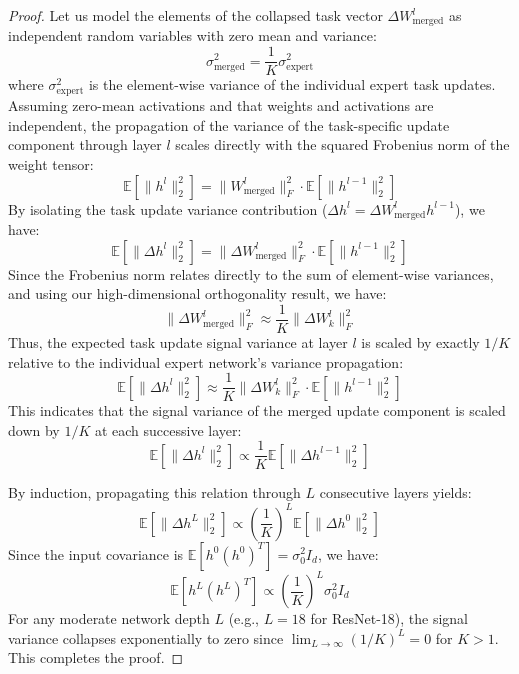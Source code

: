 \documentclass{article}
\theoremstyle{plain}
\theoremstyle{definition}
\theoremstyle{remark}
\begin{document}
\begin{proof}
Let us model the elements of the collapsed task vector $\Delta W_{\text{merged}}^l$ as independent random variables with zero mean and variance:
\begin{equation}
\sigma_{\text{merged}}^2 = \frac{1}{K} \sigma_{\text{expert}}^2
\end{equation}
where $\sigma_{\text{expert}}^2$ is the element-wise variance of the individual expert task updates. Assuming zero-mean activations and that weights and activations are independent, the propagation of the variance of the task-specific update component through layer $l$ scales directly with the squared Frobenius norm of the weight tensor:
\begin{equation}
\mathbb{E}[\|h^l\|_2^2] = \|W_{\text{merged}}^l\|_F^2 \cdot \mathbb{E}[\|h^{l-1}\|_2^2]
\end{equation}
By isolating the task update variance contribution ($\Delta h^l = \Delta W_{\text{merged}}^l h^{l-1}$), we have:
\begin{equation}
\mathbb{E}[\|\Delta h^l\|_2^2] = \|\Delta W_{\text{merged}}^l\|_F^2 \cdot \mathbb{E}[\|h^{l-1}\|_2^2]
\end{equation}
Since the Frobenius norm relates directly to the sum of element-wise variances, and using our high-dimensional orthogonality result, we have:
\begin{equation}
\|\Delta W_{\text{merged}}^l\|_F^2 \approx \frac{1}{K} \|\Delta W_k^l\|_F^2
\end{equation}
Thus, the expected task update signal variance at layer $l$ is scaled by exactly $1/K$ relative to the individual expert network's variance propagation:
\begin{equation}
\mathbb{E}[\|\Delta h^l\|_2^2] \approx \frac{1}{K} \|\Delta W_k^l\|_F^2 \cdot \mathbb{E}[\|h^{l-1}\|_2^2]
\end{equation}
This indicates that the signal variance of the merged update component is scaled down by $1/K$ at each successive layer:
\begin{equation}
\mathbb{E}[\|\Delta h^l\|_2^2] \propto \frac{1}{K} \mathbb{E}[\|\Delta h^{l-1}\|_2^2]
\end{equation}

By induction, propagating this relation through $L$ consecutive layers yields:
\begin{equation}
\mathbb{E}[\|\Delta h^L\|_2^2] \propto \left(\frac{1}{K}\right)^L \mathbb{E}[\|\Delta h^0\|_2^2]
\end{equation}
Since the input covariance is $\mathbb{E}[h^0 (h^0)^T] = \sigma_0^2 I_d$, we have:
\begin{equation}
\mathbb{E}[h^L (h^L)^T] \propto \left(\frac{1}{K}\right)^L \sigma_0^2 I_d
\end{equation}
For any moderate network depth $L$ (e.g., $L=18$ for ResNet-18), the signal variance collapses exponentially to zero since $\lim_{L \to \infty} (1/K)^L = 0$ for $K > 1$. This completes the proof.
\end{proof}
\end{document}
